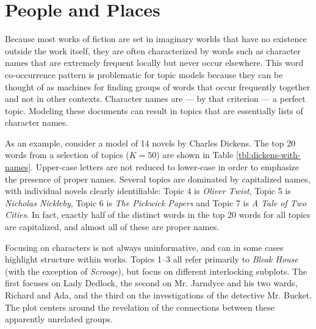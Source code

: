 

\section{People and Places}

Because most works of fiction are set in imaginary worlds that have no existence outside the work itself, they are often characterized by words such as character names that are extremely frequent locally but never occur elsewhere.
This word co-occurrence pattern is problematic for topic models because they can be thought of as machines for finding groups of words that occur frequently together and not in other contexts.
Character names are --- by that criterion --- a perfect topic.
Modeling these documents can result in topics that are essentially lists of character names.

As an example, consider a model of 14 novels by Charles Dickens.
The top 20 words from a selection of topics ($K=50$) are shown in Table \ref{tbl:dickens-with-names}.
Upper-case letters are not reduced to lower-case in order to emphasize the presence of proper names.
Several topics are dominated by capitalized names, with individual novels clearly identifiable: Topic 4 is {\em Oliver Twist}, Topic 5 is {\em Nicholas Nickleby}, Topic 6 is {\em The Pickwick Papers} and Topic 7 is {\em A Tale of Two Cities}.
In fact, exactly half of the distinct words in the top 20 words for all topics are capitalized, and almost all of these are proper names.

Focusing on characters is not always uninformative, and can in some cases highlight structure within works.
Topics 1--3 all refer primarily to {\em Bleak House} (with the exception of {\em Scrooge}), but focus on different interlocking subplots.
The first focuses on Lady Dedlock, the second on Mr. Jarndyce and his two wards, Richard and Ada, and the third on the investigations of the detective Mr. Bucket.
The plot centers around the revelation of the connections between these apparently unrelated groups.

